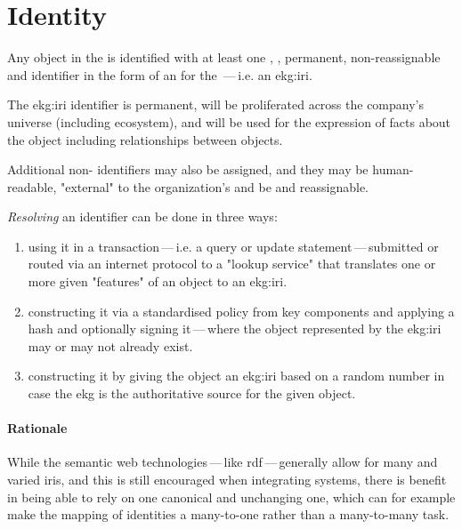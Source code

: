 \section{Identity}\label{sec:ekg-principles-identity}

Any object in the  is identified with at least one , ,
permanent, non-reassignable and  identifier in the form of an 
for the \,---\,i.e. an \gls{ekg:iri}.

The \gls{ekg:iri} identifier is permanent, will be proliferated across the company's universe (including ecosystem),
and will be used for the expression of facts about the object including relationships between objects.

Additional non- identifiers may also be assigned, and they may be human-readable,
"external" to the organization's  and be  and reassignable.

\textit{Resolving} an identifier can be done in three ways:

\begin{enumerate}
    \item using it in a transaction\,---\,i.e. a query or update statement\,---\,submitted or routed via an
          internet protocol to a "lookup service" that translates one or more given "features" of an
          object to an \gls{ekg:iri}.
    \item constructing it via a standardised policy from key components and applying a hash and optionally
          signing it\,---\,where the object represented by the \gls{ekg:iri} may or may not already exist.
    \item constructing it by giving the object an \gls{ekg:iri} based on a random number in case the \gls{ekg} is
          the authoritative source for the given object.
\end{enumerate}

\paragraph{Rationale}

While the semantic web technologies\,---\,like \gls{rdf}\,---\,generally allow for many and varied \glspl{iri},
and this is still encouraged when integrating systems, there is benefit in being able to rely on one canonical
and unchanging one, which can for example make the mapping of identities a many-to-one rather than a many-to-many task.

